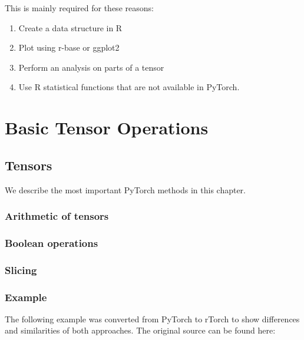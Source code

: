 \documentclass[]{book}
\providecommand{\tightlist}{%
  \setlength{\itemsep}{0pt}\setlength{\parskip}{0pt}}
\begin{document}
This is mainly required for these reasons:

\begin{enumerate}
\def\labelenumi{\arabic{enumi}.}
\tightlist
\item
  Create a data structure in R
\item
  Plot using r-base or ggplot2
\item
  Perform an analysis on parts of a tensor
\item
  Use R statistical functions that are not available in PyTorch.
\end{enumerate}

\hypertarget{part-basic-tensor-operations}{%
\part{Basic Tensor Operations}\label{part-basic-tensor-operations}}

\hypertarget{tensors}{%
\chapter{Tensors}\label{tensors}}

We describe the most important PyTorch methods in this chapter.

\hypertarget{arithmetic-of-tensors}{%
\section{Arithmetic of tensors}\label{arithmetic-of-tensors}}

\hypertarget{boolean-operations}{%
\section{Boolean operations}\label{boolean-operations}}

\hypertarget{slicing}{%
\section{Slicing}\label{slicing}}

\hypertarget{example-3}{%
\section{Example}\label{example-3}}

The following example was converted from PyTorch to rTorch to show differences and similarities of both approaches. The original source can be found here:
\end{document}
